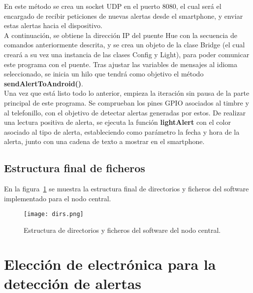         \vspace{0.3cm}

        En este método se crea un socket UDP en el puerto 8080, el cual será el encargado de recibir peticiones de nuevas alertas desde el smartphone, y enviar estas alertas hacia el dispositivo. \\

        A continuación, se obtiene la dirección IP del puente Hue con la secuencia de comandos anteriormente descrita, y se crea un objeto de la clase Bridge (el cual creará a su vez una instancia de las clases Config y Light), para poder comunicar este programa con el puente. Tras ajustar las variables de mensajes al idioma seleccionado, se inicia un hilo que tendrá como objetivo el método \textbf{sendAlertToAndroid()}. \\

        Una vez que está listo todo lo anterior, empieza la iteración sin pausa de la parte principal de este programa. Se comprueban los pines GPIO asociados al timbre y al telefonillo, con el objetivo de detectar alertas generadas por estos. De realizar una lectura positiva de alerta, se ejecuta la función \textbf{lightAlert} con el color asociado al tipo de alerta, estableciendo como parámetro la fecha y hora de la alerta, junto con una cadena de texto a mostrar en el smartphone. \\

    \subsection{Estructura final de ficheros}

        En la figura~\ref{dirs} se muestra la estructura final de directorios y ficheros del software implementado para el nodo central.

        \begin{figure}[!ht]
          \centering
            \texttt{[image: dirs.png]}
          \caption{Estructura de directorios y ficheros del software del nodo central.}
          \label{dirs}
        \end{figure}

\section{Elección de electrónica para la detección de alertas}
\label{sec:sistemas_interconexion}

